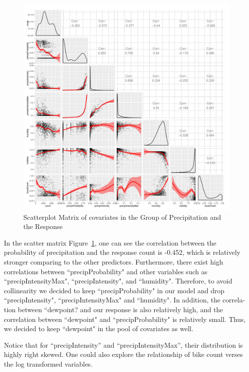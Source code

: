 \documentclass [11pt, proquest] {uwthesis}[2015/03/03]
\begin{document}
\begin{figure}
   \includegraphics[width=1\textwidth]{figures/matrix1} 
  \caption{Scatterplot Matrix of covariates in the Group of Precipitation and the Response}
  \label{fig:precip_corr}
\end{figure}

In the scatter matrix Figure~\ref{fig:precip_corr}, one can see the correlation between the probability of precipitation and the response count is -0.452, which is relatively stronger comparing to the other predictors. Furthermore, there exist high correlations between ``precipProbability" and other variables such as ``precipIntensityMax", ``precipIntensity", and ``humidity". Therefore, to avoid collinearity we decided to keep ``precipProbability" in our model and drop ``precipIntensity", ``precipIntensityMax" and ``humidity". In addition, the correla- tion between ``dewpoint? and our response is also relatively high, and the correlation between ``dewpoint" and ``precipProbability" is relatively small. Thus, we decided to keep ``dewpoint" in the pool of covariates as well.

Notice that for ``precipIntensity'' and ``precipIntensityMax'', their distribution is highly right skewed. One could also explore the relationship of bike count verses the log transformed variables.
\end{document}
